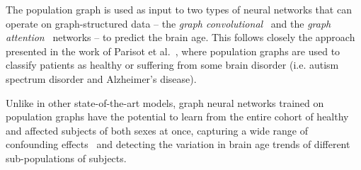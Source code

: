 The population graph is used as input to two types of neural networks that can operate on graph-structured data – the \textit{graph convolutional}~\cite{kipf2017semi} and the \textit{graph attention}~\cite{velickovic2018graph} networks – to predict the brain age. This follows closely the approach presented in the work of Parisot et al.~\cite{parisot2017spectral,parisot2018disease}, where population graphs are used to classify patients as healthy or suffering from some brain disorder (i.e. autism spectrum disorder and Alzheimer's disease).


Unlike in other state-of-the-art models, graph neural networks trained on population graphs have the potential to learn from the entire cohort of healthy and affected subjects of both sexes at once, capturing a wide range of confounding effects~\cite{ruigrok2014meta, lancet2016sex} and detecting the variation in brain age trends of different sub-populations of subjects. 

 
 




